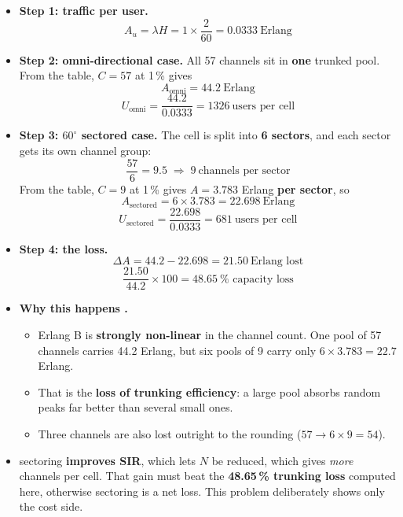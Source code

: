 \begin{itemize}
  \item \textbf{Step 1: traffic per user.}
        \[ A_u = \lambda H = 1 \times \frac{2}{60} = 0.0333\ \text{Erlang} \]
  \item \textbf{Step 2: omni-directional case.}
        All 57 channels sit in \textbf{one} trunked pool.
        From the table, $C = 57$ at 1\,\% gives
        \[ A_{\text{omni}} = 44.2\ \text{Erlang} \]
        \[ U_{\text{omni}} = \frac{44.2}{0.0333} = 1326\ \text{users per cell} \]
  \item \textbf{Step 3: $60^\circ$ sectored case.}
        The cell is split into \textbf{6 sectors}, and each sector gets its own channel group:
        \[ \frac{57}{6} = 9.5 \;\Rightarrow\; 9\ \text{channels per sector} \]
        From the table, $C = 9$ at 1\,\% gives $A = 3.783$ Erlang \textbf{per sector}, so
        \[ A_{\text{sectored}} = 6 \times 3.783 = 22.698\ \text{Erlang} \]
        \[ U_{\text{sectored}} = \frac{22.698}{0.0333} = 681\ \text{users per cell} \]
  \item \textbf{Step 4: the loss.}
        \[ \Delta A = 44.2 - 22.698 = \boxed{21.50\ \text{Erlang lost}} \]
        \[ \frac{21.50}{44.2} \times 100 = \boxed{48.65\ \% \text{ capacity loss}} \]
  \item \textbf{Why this happens .}
  \begin{itemize}
    \item Erlang B is \textbf{strongly non-linear} in the channel count. One pool of 57 channels
          carries 44.2 Erlang, but six pools of 9 carry only $6 \times 3.783 = 22.7$ Erlang.
    \item That is the \textbf{loss of trunking efficiency}: a large pool absorbs random peaks far
          better than several small ones.
    \item Three channels are also lost outright to the rounding ($57 \rightarrow 6 \times 9 = 54$).
  \end{itemize}
  \item {} sectoring \textbf{improves SIR}, which lets $N$ be
        reduced, which gives \emph{more} channels per cell. That gain must beat the
        \textbf{48.65\,\% trunking loss} computed here, otherwise sectoring is a net loss. This
        problem deliberately shows only the cost side.
\end{itemize}

